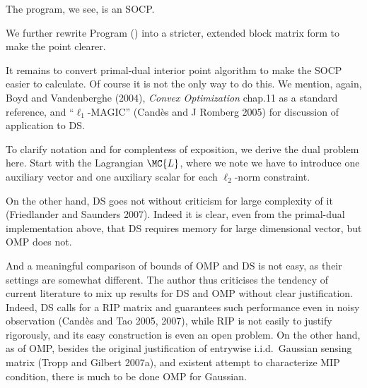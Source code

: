 The program, we see, is an SOCP.

We further rewrite Program () into a stricter, extended block matrix form to make the point clearer.

\color[red]{(To be done)}

\startsection [title={Primal-Dual Interior Point Algorithm}]

It remains to convert primal-dual interior point algorithm to make the SOCP easier to calculate.
Of course it is not the only way to do this.
We mention, again, Boyd and Vandenberghe (2004), {\it Convex Optimization} chap.11 as a standard reference, and ``\(\ell_1\)-MAGIC'' (Cand\`es and J Romberg 2005) for discussion of application to DS.

To clarify notation and for complentess of exposition, we derive the dual problem here.
Start with the Lagrangian \(\MC{L}\), where we note we have to introduce one auxiliary vector and one auxiliary scalar for each \(\ell_2\)-norm constraint.

%
%

\startsection [title={Discussion}]


On the other hand, DS goes not without criticism for large complexity of it (Friedlander and Saunders 2007).
Indeed it is clear, even from the primal-dual implementation above, that DS requires memory for large dimensional vector, but OMP does not.

And a meaningful comparison of bounds of OMP and DS is not easy, as their settings are somewhat different.
The author thus criticises the tendency of current literature to mix up results for DS and OMP without clear justification.
Indeed, DS calls for a RIP matrix and guarantees such performance even in noisy observation (Cand\`es and Tao 2005, 2007), while RIP is not easily to justify rigorously, and its easy construction is even an open problem.
On the other hand, as of OMP, besides the original justification of entrywise i.i.d.\ Gaussian sensing matrix (Tropp and Gilbert 2007a), and existent attempt to characterize MIP condition, there is much to be done OMP for Gaussian.

\stopchapter
